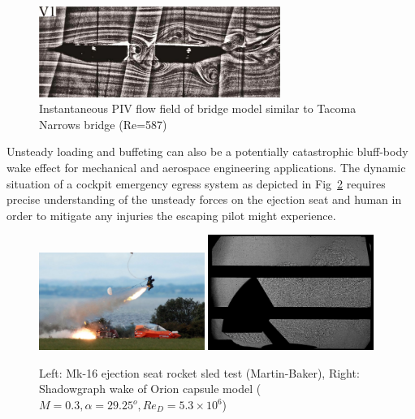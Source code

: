 \documentclass[journal]{new-aiaa}
\begin{document}
\begin{figure}[htb]
\begin{center}
\includegraphics[width=0.7\textwidth]{Images/logan/yuan2017investigation_TacomaNarrowsWake.pdf}
\caption{ Instantaneous PIV flow field of bridge model similar to Tacoma Narrows bridge (Re=587) \cite{yuan2017investigation} }
\label{fig:tacomanarrowswake}
\end{center}
\end{figure}

Unsteady loading and buffeting can also be a potentially catastrophic bluff-body wake effect for mechanical and aerospace engineering applications.  The dynamic situation of a cockpit emergency egress system as depicted in Fig~\ref{fig:orionwakeandejectionseat} requires precise understanding of the unsteady forces on the ejection seat and human in order to mitigate any injuries the escaping pilot might experience.

\begin{figure}[htb]
\begin{center}
\includegraphics[width=0.48\textwidth]{Images/logan/martinbaker_EjectionSeat.jpg}
\includegraphics[width=0.48\textwidth]{Images/logan/ross2013comprehensive_CapsuleWakeShadowgraph.pdf}
\caption{ Left: Mk-16 ejection seat rocket sled test (Martin-Baker), Right: Shadowgraph wake of Orion capsule model ($M=0.3, \alpha=29.25^o, Re_D = 5.3\times10^6$) \cite{ross2013comprehensive}}
\label{fig:orionwakeandejectionseat}
\end{center}
\end{figure}
\end{document}
